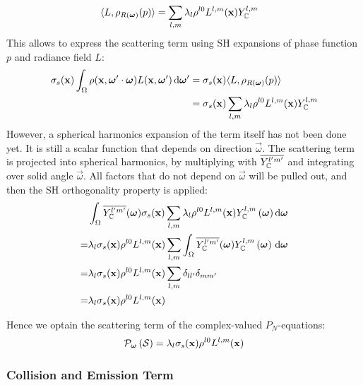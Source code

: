 \begin{align*}
\langle L,  \rho_{R(\boldsymbol{\mathbf{\omega}})}(p)\rangle
&=
\sum_{l,m}
{
\lambda_l
\rho^{l0}L^{l,m}(\boldsymbol{\mathbf{x}})
Y_{\mathbb{C}}^{l,m}
}
\end{align*}
This allows to express the scattering term using SH expansions of phase function $p$ and radiance field $L$:
\begin{align*}
\sigma_s(\boldsymbol{\mathbf{x}})\int_{\Omega}\rho(\boldsymbol{\mathbf{x}}, \boldsymbol{\mathbf{\omega}}'\cdot\boldsymbol{\mathbf{\omega}})L(\boldsymbol{\mathbf{x}}, \boldsymbol{\mathbf{\omega}}')\,\mathrm{d}\boldsymbol{\mathbf{\omega}}'
&=
\sigma_s(\boldsymbol{\mathbf{x}})\langle L,  \rho_{R(\boldsymbol{\mathbf{\omega}})}(p)\rangle
\\
&=
\sigma_s(\boldsymbol{\mathbf{x}})
\sum_{l,m}
{
\lambda_l
\rho^{l0}L^{l,m}(\boldsymbol{\mathbf{x}})
Y_{\mathbb{C}}^{l,m}
}
\end{align*}
However, a spherical harmonics expansion of the term itself has not been done yet. It is still a scalar function that depends on direction $\vec{\omega}$. The scattering term is projected into spherical harmonics, by multiplying with $\overline {Y_{\mathbb{C}}^{l'm'}}$ and integrating over solid angle $\vec{\omega}$. All factors that do not depend on $\vec{\omega}$ will be pulled out, and then the SH orthogonality property is applied:
\begin{align*}
&
\int_{\Omega}
{
\overline{Y_{\mathbb{C}}^{l'm'}}(\boldsymbol{\mathbf{\omega}})
\sigma_s(\boldsymbol{\mathbf{x}})
\sum_{l,m}
{
\lambda_l
\rho^{l0}L^{l,m}(\boldsymbol{\mathbf{x}})
Y_{\mathbb{C}}^{l,m}\left(\boldsymbol{\mathbf{\omega}}\right)
}
\,\mathrm{d}\boldsymbol{\mathbf{\omega}}
}
\nonumber\\
=&
\lambda_l
\sigma_s(\boldsymbol{\mathbf{x}})
\rho^{l0}L^{l,m}(\boldsymbol{\mathbf{x}})
\sum_{l,m}
{
\int_{\Omega}
{
\overline{Y_{\mathbb{C}}^{l'm'}}(\boldsymbol{\mathbf{\omega}})
Y_{\mathbb{C}}^{l,m}\left(\boldsymbol{\mathbf{\omega}}\right)
\,\mathrm{d}\boldsymbol{\mathbf{\omega}}
}
}
\nonumber\\
=&
\lambda_l
\sigma_s(\boldsymbol{\mathbf{x}})
\rho^{l0}L^{l,m}(\boldsymbol{\mathbf{x}})
\sum_{l,m}
{
\delta_{ll'}\delta_{mm'}
}
\nonumber\\
=&
\lambda_l
\sigma_s(\boldsymbol{\mathbf{x}})
\rho^{l0}L^{l,m}(\boldsymbol{\mathbf{x}})
\end{align*}

Hence we optain the scattering term of the complex-valued $P_N$-equations:
\begin{align}
\mathcal{P}_{\boldsymbol{\mathbf{\omega}}}\left(\mathcal{S}\right)
=
\lambda_l
\sigma_s(\boldsymbol{\mathbf{x}})
\rho^{l0}L^{l,m}(\boldsymbol{\mathbf{x}})
\label{eq:sh_complex_scattering}
\end{align}



\subsubsection*{Collision and Emission Term}

